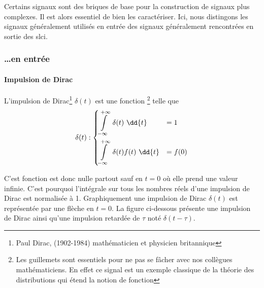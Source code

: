Certains signaux sont des briques de base pour la construction de
signaux plus complexes. Il est alors essentiel de bien les caractériser.
Ici, nous distingons les signaux généralement utilisés en 
entrée des signaux généralement rencontrées en sortie des \gls{slci}.

\subsubsection{\ldots en entrée}

\paragraph{Impulsion de Dirac}

L'impulsion de Dirac\footnote{Paul Dirac, (1902-1984) 
mathématicien et physicien britannique} $\delta(t)$ est une \og fonction\fg 
\footnote{Les guillemets sont essentiels pour ne pas se fâcher avec 
nos collègues mathématiciens. En effet ce signal est un exemple classique de la 
théorie des distributions qui étend la notion de fonction} telle que
\begin{align*}
\delta(t) : 
\begin{dcases}
	\int\limits_{-\infty}^{+\infty}	 \delta(t)\,\,\dd{t}&=1   \\
\int\limits_{-\infty}^{+\infty}  \delta(t)f(t)\,\,\dd{t}&=f(0)	
\end{dcases}
\end{align*}

C'est fonction est donc nulle partout sauf en $t=0$ où elle prend 
une valeur infinie. C'est pourquoi l'intégrale sur tous les nombres réels 
d'une impulsion de Dirac est normalisée à 1.
Graphiquement une impulsion de Dirac $\delta(t)$ est 
représentée par une flèche en $t=0$. La figure ci-dessous présente 
une impulsion de Dirac ainsi qu'une 
impulsion retardée de $\tau$ noté $\delta(t-\tau)$.

\begin{figure}[!h]
\begin{center}

\end{center}
\end{figure}

